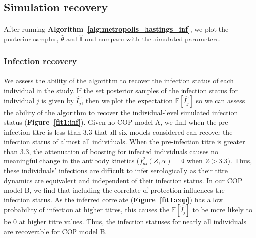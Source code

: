 \subsection{Simulation recovery }
\paragraph{} After running \textbf{Algorithm~\ref{alg:metropolis_hastings_inf}}, we plot the posterior samples, $\hat{\theta}$ and $\hat{\mathbf{I}}$ and compare with the simulated parameters.

\subsubsection{Infection recovery}

\paragraph{}We assess the ability of the algorithm to recover the infection status of each individual in the study. If the set posterior samples of the infection status for individual $j$ is given by $\hat{I_j} $, then we plot the expectation $\mathbb{E}[\hat{I_j}]$ so we can assess the ability of the algorithm to recover the individual-level simulated infection status (\textbf{Figure~\ref{fit1:inf}}). Given no COP model A, we find when the pre-infection titre is less than 3.3 that all six models considered can recover the infection status of almost all individuals. When the pre-infection titre is greater than 3.3, the attenuation of boosting for infected individuals causes no meaningful change in the antibody kinetics ($f^2_{ab}(Z, \alpha) = 0$ when $Z > 3.3$). Thus, these individuals' infections are difficult to infer serologically as their titre dynamics are equivalent and independent of their infection status. In our COP model B, we find that including the correlate of protection influences the infection status. As the inferred correlate (\textbf{Figure~\ref{fit1:cop}}) has a low probability of infection at higher titres, this causes the $\mathbb{E}[\hat{I_j}]$ to be more likely to be 0 at higher titre values. Thus, the infection statuses for nearly all individuals are recoverable for COP model B.

